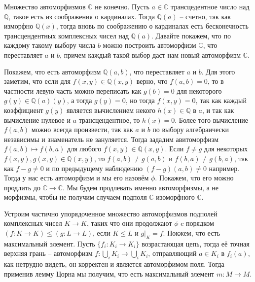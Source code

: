 \documentclass{article}
\begin{document}
\begin{enumerate}
        Множество автоморфизмов $\mathbb{C}$ не конечно. Пусть $a\in\mathbb{C}$
        трансцедентное число над $\mathbb{Q}$, такое есть из соображения о 
        кардиналах. Тогда $\mathbb{Q}(a)$ – счетно, так как изморфно
        $\mathbb{Q}(x)$, тогда вновь по соображению о кардиналах есть
        бесконечность трансцендентных комплексных чисел над $\mathbb{Q}(a)$.
        Давайте покажем, что по каждому такому выбору числа $b$ можно построить
        автоморфизм $\mathbb{C}$, что переставляет $a$ и $b$, причем каждый
        такой выбор даст нам новый автоморфизм $\mathbb{C}$.

        Покажем, что есть автоморфизм $\mathbb{Q}(a,b)$, что переставляет $a$ и
        $b$. Для этого заметим, что если для $f(x,y)\in\mathbb{Q}(x,y)$ верно,
        что $f(a,b)=0$, то в частности левую часть можно переписать как
        $g(b)=0$ для некоторого $g(y)\in\mathbb{Q}(a)(y)$, а тогда $g(y)=0$, но
        тогда $f(x,y)=0$, так как каждый коэффициент $g(y)$ является
        вычислением некого $h(x)\in\mathbb{Q}$ в $a$, и так как вычисление
        нулевое и $a$ трансцендентное, то $h(x)=0$. Более того вычисление
        $f(a,b)$ можно всегда произвести, так как $a$ и $b$ по выбору
        алгебраически независимы и знаменатель не зануляется. Тогда зададим
        авитоморфизм $f(a,b)\mapsto f(b,a)$ для любого $f(x,y)\in
        \mathbb{Q}(x,y)$. Если $f\neq g$ для некоторых $f(x,y),g(x,y)\in
        \mathbb{Q}(x,y)$, то $f(a,b)\neq g(a,b)$ и $f(b,a)\neq g(b,a)$, так
        как $f-g\neq 0$ и по предыдущему наблюдению $(f-g)(a,b)\neq 0$ например.
        Тогда у нас есть автоморфизм и мы его назовём $\phi$. Покажем, что его
        можно продлить до $\mathbb{C}\rightarrow\mathbb{C}$. Мы будем продлевать
        именно автоморфизмы, а не морфизмы, чтобы не получим случаем подполя
        $\mathbb{C}$ изоморфного $\mathbb{C}$.

        Устроим частично упорядоченное множество автоморфизмов подполей
        комплексных чисел $K\rightarrow K$, таких что они продолжают $\phi$ c
        порядком $(f:K\rightarrow K)\le(g:L\rightarrow L)$, если $K\le L$ и
        $g|_K=f$. Покжем, что есть максимальный элемент. Пусть $\{f_i:K_i
        \rightarrow K_i\}$ возрастающая цепь, тогда её точная верхняя грань –
        автоморфизм $f:\bigcup_iK_i\rightarrow\bigcup_iK_i$, отправляющий
        $a\in K_i$ в $f_i(a)$, как нетрудно видеть, он корректен и является
        автоморфимом поля. Тогда применив лемму Цорна мы получим, что есть
        максимальный элемент $m:M\rightarrow M$.


\end{enumerate}
\end{document}
